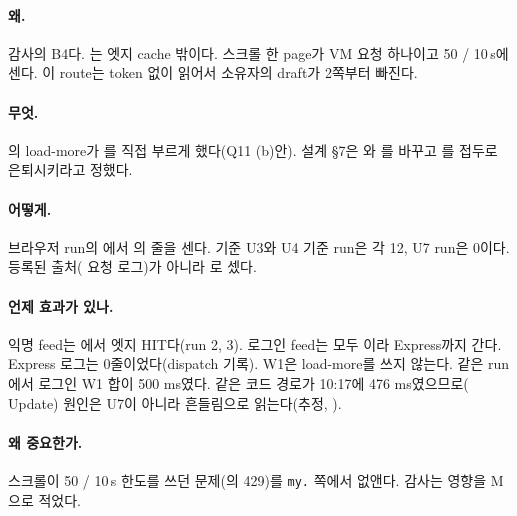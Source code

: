 \paragraph{왜.}
감사의 B4다. 는 엣지 cache 밖이다. 스크롤 한 page가 VM 요청 하나이고 50 / 10\,s에 센다.
이 route는 token 없이 읽어서 소유자의 draft가 2쪽부터 빠진다.

\paragraph{무엇.}
의 load-more가 를 직접 부르게 했다(Q11 (b)안).
설계 \S7은 와 를 바꾸고
를  접두로 은퇴시키라고 정했다.

\paragraph{어떻게.}
브라우저 run의 에서 의  줄을 센다.
기준 U3와 U4 기준 run은 각 12, U7 run은 0이다.
등록된 출처( 요청 로그)가 아니라 로 셌다.

\paragraph{언제 효과가 있나.}
익명 feed는 에서 엣지 HIT다(run 2, 3). 로그인 feed는 모두 이라 Express까지 간다.
Express  로그는 0줄이었다(dispatch 기록).
W1은 load-more를 쓰지 않는다. 같은 run에서 로그인 W1 합이 500 ms였다. 같은 코드 경로가 10:17에 476 ms였으므로( Update) 원인은 U7이 아니라 흔들림으로 읽는다(추정, ).

\paragraph{왜 중요한가.}
스크롤이 50 / 10\,s 한도를 쓰던 문제(의 429)를 \texttt{my.} 쪽에서 없앤다. 감사는 영향을 M으로 적었다.
